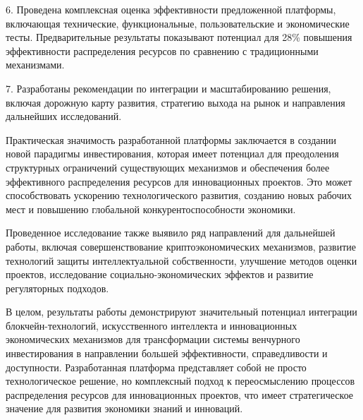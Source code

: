 \documentclass[
    14pt,
    specialist,
    candidate, %
    subf, %
    href,
    dotsinheaders=false
]{disser}
\begin{document}
6. Проведена комплексная оценка эффективности предложенной платформы, включающая технические, функциональные, пользовательские и экономические тесты. Предварительные результаты показывают потенциал для 28\% повышения эффективности распределения ресурсов по сравнению с традиционными механизмами.

7. Разработаны рекомендации по интеграции и масштабированию решения, включая дорожную карту развития, стратегию выхода на рынок и направления дальнейших исследований.

Практическая значимость разработанной платформы заключается в создании новой парадигмы инвестирования, которая имеет потенциал для преодоления структурных ограничений существующих механизмов и обеспечения более эффективного распределения ресурсов для инновационных проектов. Это может способствовать ускорению технологического развития, созданию новых рабочих мест и повышению глобальной конкурентоспособности экономики.

Проведенное исследование также выявило ряд направлений для дальнейшей работы, включая совершенствование криптоэкономических механизмов, развитие технологий защиты интеллектуальной собственности, улучшение методов оценки проектов, исследование социально-экономических эффектов и развитие регуляторных подходов.

В целом, результаты работы демонстрируют значительный потенциал интеграции блокчейн-технологий, искусственного интеллекта и инновационных экономических механизмов для трансформации системы венчурного инвестирования в направлении большей эффективности, справедливости и доступности. Разработанная платформа представляет собой не просто технологическое решение, но комплексный подход к переосмыслению процессов распределения ресурсов для инновационных проектов, что имеет стратегическое значение для развития экономики знаний и инноваций.

\renewcommand{\bibname}{\fontsize{14pt}{21pt}\selectfont СПИСОК ИСПОЛЬЗОВАННЫХ ИСТОЧНИКОВ}


\end{document}
